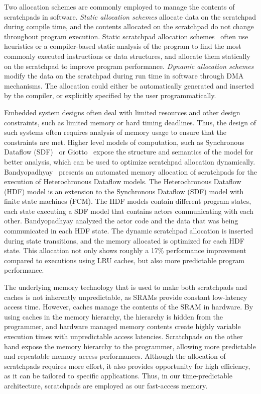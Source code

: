 Two allocation schemes are commonly employed to manage the contents of scratchpads in software.
\emph{Static allocation schemes} allocate data on the scratchpad during compile time, and the contents allocated on the scratchpad do not change throughout program execution. 
Static scratchpad allocation schemes~\cite{Suhendra2005WCETSPM, Patel2008PRETSPM} often use heuristics or a compiler-based static analysis of the program to find the most commonly executed instructions or data structures, and allocate them statically on the scratchpad to improve program performance. 
\emph{Dynamic allocation schemes} modify the data on the scratchpad during run time in software through DMA mechanisms.
The allocation could either be automatically generated and inserted by the compiler, or explicitly specified by the user programmatically.

Embedded system designs often deal with limited resources and other design constraints, such as limited memory or hard timing deadlines.    
Thus, the design of such systems often requires analysis of memory usage to ensure that the constraints are met. 
Higher level models of computation, such as Synchronous Dataflow (SDF)~\cite{lee_sdf} or Giotto~\cite{henzinger_giotto} expose the structure and semantics of the model for better analysis, which can be used to optimize scratchpad allocation dynamically.
Bandyopadhyay~\cite{Bandyopadhyay06_AutomatedMemoryAllocationOfActorCodeDataBufferInHeterochronous} presents an automated memory allocation of scratchpads for the execution of Heterochronous Dataflow models.
The Heterochronous Dataflow (HDF) model is an extension to the Synchronous Dataflow (SDF) model with finite state machines (FCM). 
The HDF models contain different program states, each state executing a SDF model that contains actors communicating with each other. 
Bandyopadhyay analyzed the actor code and the data that was being communicated in each HDF state.
The dynamic scratchpad allocation is inserted during state transitions, and the memory allocated is optimized for each HDF state. 
This allocation not only shows roughly a 17\% performance improvement compared to executions using LRU caches, but also more predictable program performance.

The underlying memory technology that is used to make both scratchpads and caches is not inherently unpredictable, as SRAMs provide constant low-latency access time. 
However, caches manage the contents of the SRAM in hardware. 
By using caches in the memory hierarchy, the hierarchy is hidden from the programmer, and hardware managed memory contents create highly variable execution times with unpredictable access latencies. 
Scratchpads on the other hand expose the memory hierarchy to the programmer, allowing more predictable and repeatable memory access performances.
Although the allocation of scratchpads requires more effort, it also provides opportunity for high efficiency, as it can be tailored to specific applications.   
Thus, in our time-predictable architecture, scratchpads are employed as our fast-access memory. 

